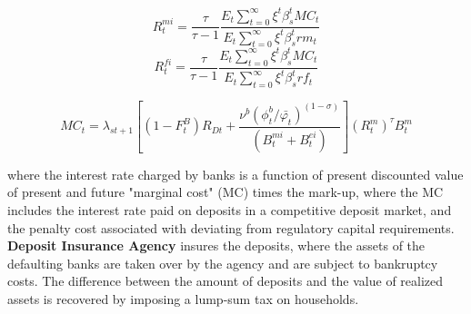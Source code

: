 \documentclass[12pt]{article}
\numberwithin{equation}{section}
\begin{document}

\begin{equation}
R^{mi}_t=\frac{\tau}{\tau-1}\frac{E_t\sum _{t=0}^{\infty }\xi^t\beta_{s}^t MC_t}{E_t\sum _{t=0}^{\infty }\xi^t\beta_{s}^t rm_t}
\end{equation}
\begin{equation}
R^{fi}_t=\frac{\tau}{\tau-1}\frac{E_t\sum _{t=0}^{\infty }\xi^t\beta_{s}^t MC_t}{E_t\sum _{t=0}^{\infty }\xi^t\beta_{s}^t rf_t}
\end{equation}

\begin{equation}
MC_t=\lambda_{st+1}[(1-F^B_t)R_{Dt}+\frac{\nu^b(\phi^b_t/{\bar{\varphi_t}})^{(1-\sigma)}}{(B^{mi}_t+B^{ei}_t)}](R^m_t)^\tau B^m_t
\end{equation}

where the interest rate charged by banks is a function of present discounted value of present and future "marginal cost" (MC) times the mark-up, where the MC includes the interest rate paid on deposits in a competitive deposit market, and the penalty cost associated with deviating from regulatory capital requirements.  
\textbf{Deposit Insurance Agency} insures the deposits, where the assets of the defaulting banks are taken over by the agency and are subject to bankruptcy costs. The difference between the amount of deposits and the value of realized assets is recovered by imposing a lump-sum tax on households. 
\end{document}
